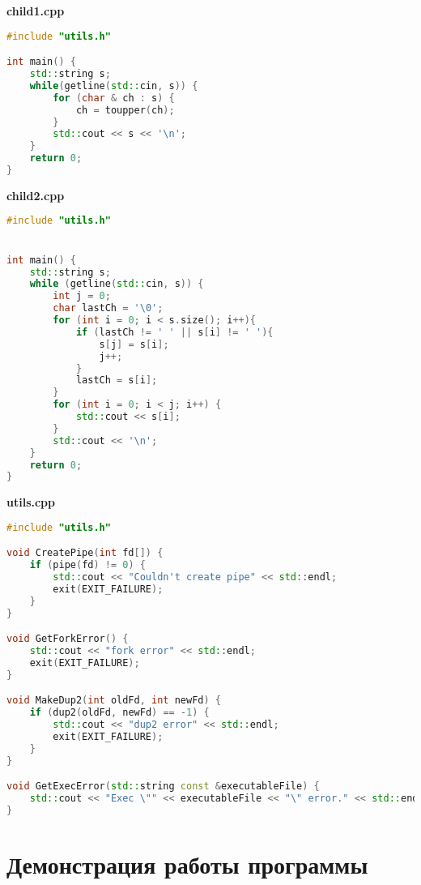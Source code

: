 \documentclass[pdf, unicode, 12pt, a4paper,oneside,fleqn]{article}
\begin{document}
{\large\textbf{child1.cpp}}

\begin{lstlisting}[language=C++]
#include "utils.h"

int main() {
    std::string s;
    while(getline(std::cin, s)) {
        for (char & ch : s) {
            ch = toupper(ch);
        }
        std::cout << s << '\n';
    }
    return 0;
}
\end{lstlisting}

{\large\textbf{child2.cpp}}

\begin{lstlisting}[language=C++]
#include "utils.h"


int main() {
    std::string s;
    while (getline(std::cin, s)) {
        int j = 0;
        char lastCh = '\0';
        for (int i = 0; i < s.size(); i++){
            if (lastCh != ' ' || s[i] != ' '){
                s[j] = s[i];
                j++;
            }
            lastCh = s[i];
        }
        for (int i = 0; i < j; i++) {
            std::cout << s[i];
        }
        std::cout << '\n';
    }
    return 0;
}
\end{lstlisting}


{\large\textbf{utils.cpp}}

\begin{lstlisting}[language=C++]
#include "utils.h"

void CreatePipe(int fd[]) {
    if (pipe(fd) != 0) {
        std::cout << "Couldn't create pipe" << std::endl;
        exit(EXIT_FAILURE);
    }
}

void GetForkError() {
    std::cout << "fork error" << std::endl;
    exit(EXIT_FAILURE);
}

void MakeDup2(int oldFd, int newFd) {
    if (dup2(oldFd, newFd) == -1) {
        std::cout << "dup2 error" << std::endl;
        exit(EXIT_FAILURE);
    }
}

void GetExecError(std::string const &executableFile) {
    std::cout << "Exec \"" << executableFile << "\" error." << std::endl;
}

\end{lstlisting}

\section{Демонстрация работы программы}
\end{document}
